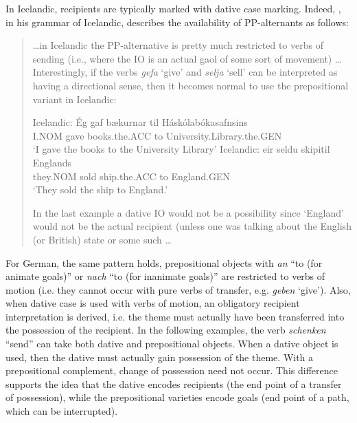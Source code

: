 	In Icelandic, recipients are typically marked with dative case marking. Indeed, \cite{Thrainsson.2007}, in his grammar of Icelandic, describes the availability of PP-alternants as follows: 
	\begin{quotation}
	\ldots in Icelandic the PP-alternative is pretty much restricted to verbs of sending (i.e., where the IO is an actual gaol of some sort of movement) \ldots Interestingly, if the verbs \textit{gefa} `give' and \textit{selja} `sell' can be interpreted as having a directional sense, then it becomes normal to use the prepositional variant in Icelandic:
	\begin{exe}
		\ex Icelandic:
		\gll \'{E}g gaf b\ae kurnar til H\'ask\'olab\'okasafnsins\\
		I.NOM gave books.the.ACC to University.Library.the.GEN\\
		\trans `I gave the books to the University Library'
		\ex Icelandic:
		\gll \th eir seldu skipi\dh til Englands\\
		they.NOM sold ship.the.ACC to England.GEN\\
		\trans `They sold the ship to England.'
	\end{exe}
	In the last example a dative IO would not be a possibility since `England' would not be the actual recipient (unless one was talking about the English (or British) state or some such \ldots \citep[fn 64]{Thrainsson.2007}
	\end{quotation}
	For German, the same pattern holds, prepositional objects with \textit{an} ``to (for animate goals)'' or \textit{nach} ``to (for inanimate goals)'' are restricted to verbs of motion (i.e. they cannot occur with pure verbs of transfer, e.g. \textit{geben} `give'). Also, when dative case is used with verbs of motion, an obligatory recipient interpretation is derived, i.e. the theme must actually have been transferred into the possession of the recipient. In the following examples, the verb \textit{schenken} ``send'' can take both dative and prepositional objects. When a dative object is used, then the dative must actually gain possession of the theme. With a prepositional complement, change of possession need not occur. This difference supports the idea that the dative encodes recipients (the end point of a transfer of possession), while the prepositional varieties encode goals (end point of a path, which can be interrupted).

